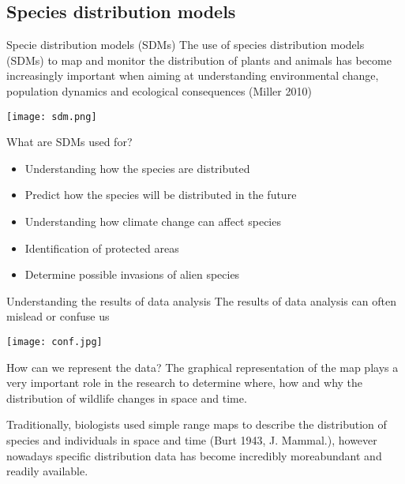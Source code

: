 \documentclass{beamer}
\begin{document}
\subsection{Species distribution models}
\begin{frame}{Specie distribution models (SDMs)}
   \centering
   The use of species distribution models (SDMs) to map and monitor the distribution of plants and animals has become increasingly important when aiming at understanding environmental change, population dynamics and ecological consequences
\textcolor{unibo}{(Miller 2010)}
\bigskip

\texttt{[image: sdm.png]}
\end{frame}
\begin{frame}{What are SDMs used for?}
    \begin{itemize}
        \item Understanding how the species are distributed \pause
        \item Predict how the species will be distributed in the future  \pause
        \item Understanding how climate change can affect species  \pause
        \item Identification of protected areas  \pause
        \item Determine possible invasions of alien species
    \end{itemize}
    
\end{frame}
\begin{frame}{Understanding the results of data analysis}
    \centering
    The results of data analysis can often mislead or confuse us
    \bigskip
    
    \texttt{[image: conf.jpg]}
\end{frame}



\begin{frame}{How can we represent the data?}
    The graphical representation of the map plays a very important role in the research
to determine where, how and why the distribution of wildlife changes in space and time.
\bigskip

Traditionally, biologists used simple range maps to describe the distribution of species and individuals in space and time \textcolor{unibo}{(Burt 1943, J. Mammal.)}, however nowadays specific distribution data has become incredibly moreabundant and readily available.
\end{frame}
\end{document}
